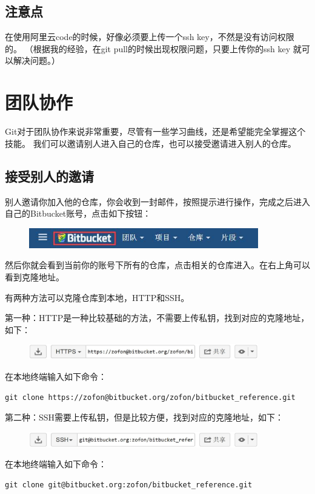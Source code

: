 \documentclass[a4paper,12pt]{ctexbook}
\begin{document}
\begin{flushleft}
\section{注意点}
在使用阿里云code的时候，好像必须要上传一个ssh key，不然是没有访问权限的。
（根据我的经验，在git pull的时候出现权限问题，只要上传你的ssh key 就可以解决问题。）


\chapter{团队协作}
Git对于团队协作来说非常重要，尽管有一些学习曲线，还是希望能完全掌握这个技能。
我们可以邀请别人进入自己的仓库，也可以接受邀请进入别人的仓库。
\section{接受别人的邀请}
别人邀请你加入他的仓库，你会收到一封邮件，按照提示进行操作，完成之后进入自己的Bitbucket账号，点击如下按钮：
\begin{figure}[H]
  \centering
  \includegraphics[width=10cm]{figures/Bitbucket_button.jpg}
\end{figure}
然后你就会看到当前你的账号下所有的仓库，点击相关的仓库进入。在右上角可以看到克隆地址。

有两种方法可以克隆仓库到本地，HTTP和SSH。

第一种：HTTP是一种比较基础的方法，不需要上传私钥，找到对应的克隆地址，如下：
\begin{figure}[H]
  \centering
  \includegraphics[width=10cm]{figures/HTTP_clone.jpg}
\end{figure}
在本地终端输入如下命令：
\begin{verbatim}
git clone https://zofon@bitbucket.org/zofon/bitbucket_reference.git
\end{verbatim}

第二种：SSH需要上传私钥，但是比较方便，找到对应的克隆地址，如下：
\begin{figure}[H]
  \centering
  \includegraphics[width=10cm]{figures/SSH_clone.jpg}
\end{figure}
在本地终端输入如下命令：
\begin{verbatim}
git clone git@bitbucket.org:zofon/bitbucket_reference.git
\end{verbatim}



\end{flushleft}
\end{document}
